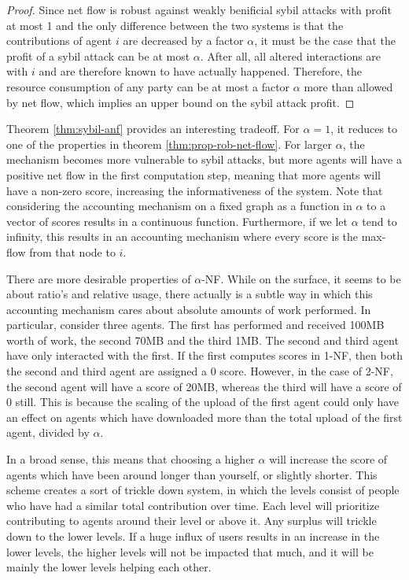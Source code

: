 \documentclass[a4paper,11pt]{book}
\theoremstyle{definition}
\begin{document}
\begin{proof}
    Since net flow is robust against weakly benificial sybil attacks with profit at most
    1 and the only difference between the two systems is that the contributions of
    agent $i$ are decreased by a factor $\alpha$, it must be the case that the profit
    of a sybil attack can be at most $\alpha$. After all, all altered interactions
    are with $i$ and are therefore known to have actually happened. Therefore, the
    resource consumption of any party can be at most a factor $\alpha$ more than allowed
    by net flow, which implies an upper bound on the sybil attack profit.
\end{proof}

Theorem \ref{thm:sybil-anf} provides an interesting tradeoff. For $\alpha=1$, it reduces
to one of the properties in theorem \ref{thm:prop-rob-net-flow}. For larger $\alpha$,
the mechanism becomes more vulnerable to sybil attacks, but more agents will have
a positive net flow in the first computation step, meaning that more agents will
have a non-zero score, increasing the informativeness of the system. Note
that considering the accounting mechanism on a fixed graph as a function in $\alpha$ to
a vector of scores results in a continuous function. Furthermore, if we let $\alpha$
tend to infinity, this results in an accounting mechanism where every score is the
max-flow from that node to $i$. 


There are more desirable properties of $\alpha$-NF. While on the surface, it seems to
be about ratio's and relative usage, there actually is a subtle way in which
this accounting mechanism cares about absolute amounts of work performed. 
In particular, consider three agents. The first has performed and received
100MB worth of work, the second 70MB and the third 1MB. The second and third
agent have only interacted with the first. If the first computes scores
in 1-NF, then both the second and third agent are assigned a 0 score.
However, in the case of 2-NF, the second agent will have a score of 20MB,
whereas the third will have a score of 0 still. This is because the scaling
of the upload of the first agent could only have an effect on agents which
have downloaded more than the total upload of the first agent, divided
by $\alpha$. 

In a broad sense, this means that choosing a higher $\alpha$ will increase the score 
of agents which have been around longer than yourself, or slightly shorter. This
scheme creates a sort of trickle down system, in which the levels consist of people
who have had a similar total contribution over time. Each level will prioritize
contributing to agents around their level or above it. Any surplus will trickle down
to the lower levels. If a huge influx of users results in an increase in the lower
levels, the higher levels will not be impacted that much, and it will be mainly the
lower levels helping each other.
\end{document}
